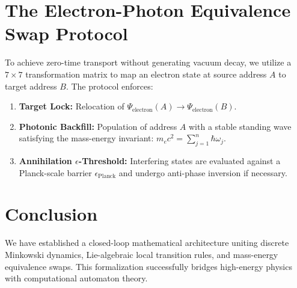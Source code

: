 \documentclass[11pt,a4paper]{article}
\begin{document}
\section{The Electron-Photon Equivalence Swap Protocol}
To achieve zero-time transport without generating vacuum decay, we utilize a $7 \times 7$ transformation matrix to map an electron state at source address $A$ to target address $B$. The protocol enforces:
\begin{enumerate}
    \item \textbf{Target Lock:} Relocation of $\Psi_{\text{electron}}(A) \to \Psi_{\text{electron}}(B)$.
    \item \textbf{Photonic Backfill:} Population of address $A$ with a stable standing wave satisfying the mass-energy invariant: $m_e c^2 = \sum_{j=1}^{n} \hbar \omega_j$.
    \item \textbf{Annihilation $\epsilon$-Threshold:} Interfering states are evaluated against a Planck-scale barrier $\epsilon_{\text{Planck}}$ and undergo anti-phase inversion if necessary.
\end{enumerate}

\section{Conclusion}
We have established a closed-loop mathematical architecture uniting discrete Minkowski dynamics, Lie-algebraic local transition rules, and mass-energy equivalence swaps. This formalization successfully bridges high-energy physics with computational automaton theory.
\end{document}
